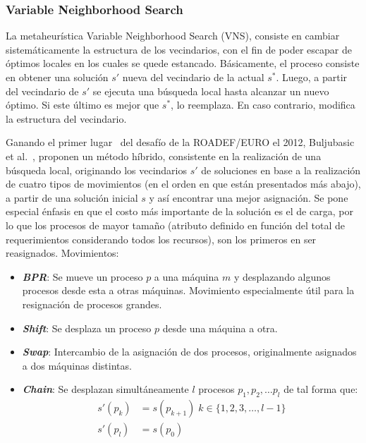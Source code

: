\documentclass[../informe2.tex]{subfiles}
\begin{document}
\subsubsection{Variable Neighborhood Search}
La metaheurística Variable Neighborhood Search (VNS), consiste en cambiar sistemáticamente la estructura de los vecindarios, con el fin de poder escapar de óptimos locales en los cuales se quede estancado. Básicamente, el proceso consiste en obtener una solución $s'$ nueva del vecindario de la actual $s^{*}$. Luego, a partir del vecindario de $s'$ se ejecuta una búsqueda local hasta alcanzar un nuevo óptimo. Si este último es mejor que $s^{*}$, lo reemplaza. En caso contrario, modifica la estructura del vecindario. \par
\noindent Ganando el primer lugar~\cite{2012ROADEFresults} del desafío de la ROADEF/EURO el 2012, Buljubasic et al.~\cite{gavranovic2012variable}, proponen un método híbrido, consistente en la realización de una búsqueda local, originando los vecindarios $s'$ de soluciones en base a la realización de cuatro tipos de movimientos (en el orden en que están presentados más abajo), a partir de una solución inicial $s$ y así encontrar una mejor asignación. Se pone especial énfasis en que el costo más importante de la solución es el de carga, por lo que los procesos de mayor tamaño (atributo definido en función del total de requerimientos considerando todos los recursos), son los primeros en ser reasignados.
Movimientos:
\begin{itemize}
	\item \textbf{\emph{BPR}}: Se mueve un proceso $p$ a una máquina $m$ y desplazando algunos procesos desde esta a otras máquinas. Movimiento especialmente útil para la resignación de procesos grandes.
	\item \textbf{\emph{Shift}}: Se desplaza un proceso $p$ desde una máquina a otra.
	\item \textbf{\emph{Swap}}:	Intercambio de la asignación de dos procesos, originalmente asignados a dos máquinas distintas.
	\item \textbf{\emph{Chain}}: Se desplazan simultáneamente $l$ procesos $p_1, p_2, \ldots p_l$ de tal forma que:
		\begin{align}
			s'(p_k) &= s(p_{k+1}) \; k \in \{1,2,3,\ldots,l-1\} \nonumber \\
			s'(p_l) &= s(p_0) \nonumber
		\end{align}
\end{itemize}
\end{document}

